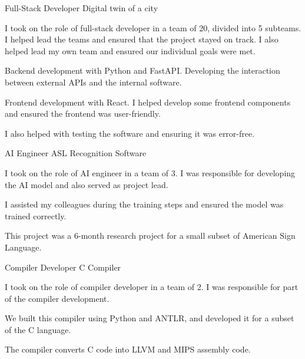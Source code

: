 
\begin{cventries}

    \cventry
    {Full-Stack Developer} %
    {Digital twin of a city} %
    {} 
    {}
    {
      \begin{cvitems} %
        \item {I took on the role of full-stack developer in a team of 20, divided into 5 subteams. I helped lead the teams and ensured that the project stayed on track. I also helped lead my own team and ensured our individual goals were met.}
        \item {Backend development with Python and FastAPI. Developing the interaction between external APIs and the internal software.}
        \item {Frontend development with React. I helped develop some frontend components and ensured the frontend was user-friendly.}
        \item {I also helped with testing the software and ensuring it was error-free.}
      \end{cvitems}
    }

    \cventry
    {AI Engineer} %
    {ASL Recognition Software} %
    {} 
    {}
    {
      \begin{cvitems} %
        \item {I took on the role of AI engineer in a team of 3. I was responsible for developing the AI model and also served as project lead.}
        \item {I assisted my colleagues during the training steps and ensured the model was trained correctly.}
        \item {This project was a 6-month research project for a small subset of American Sign Language.}
      \end{cvitems}
    }

    \cventry
    {Compiler Developer} %
    {C Compiler} %
    {} 
    {}
    {
      \begin{cvitems} %
        \item {I took on the role of compiler developer in a team of 2. I was responsible for part of the compiler development.}
        \item {We built this compiler using Python and ANTLR, and developed it for a subset of the C language.}
        \item {The compiler converts C code into LLVM and MIPS assembly code.}
      \end{cvitems}
    }

\end{cventries}
